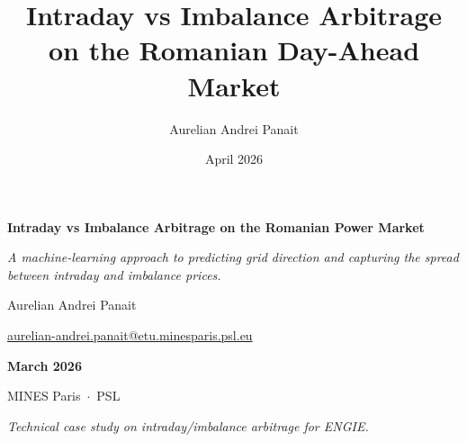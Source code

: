 \documentclass{article}
\title{Intraday vs Imbalance Arbitrage on the Romanian Day-Ahead Market}
\author{Aurelian Andrei Panait}
\date{April 2026}
\begin{document}
\begin{titlepage}
    \centering


    \vspace*{1cm}

    {\Huge \textbf{Intraday vs Imbalance Arbitrage on the Romanian Power Market} \par}

    \vspace{0.5cm}

    {\Large \textit{A machine-learning approach to predicting grid direction and capturing the spread between intraday and imbalance prices.} \par}

    \vspace{1.5cm}

    {\Large Aurelian Andrei Panait \par}
    {\large \href{mailto:aurelian-andrei.panait@etu.minesparis.psl.eu}{aurelian-andrei.panait@etu.minesparis.psl.eu} \par}

    \vspace{1cm}
   

    \vfill

     {\Large \textbf{March 2026}}\\[0.2cm]
     {\large MINES Paris~$\cdot$~PSL \par}
     \vspace{0.1cm}
    {\Large \textit{Technical case study on intraday/imbalance arbitrage for ENGIE.}}\\[0.4cm]

    \vfill

\end{titlepage}

\clearpage
\end{document}
